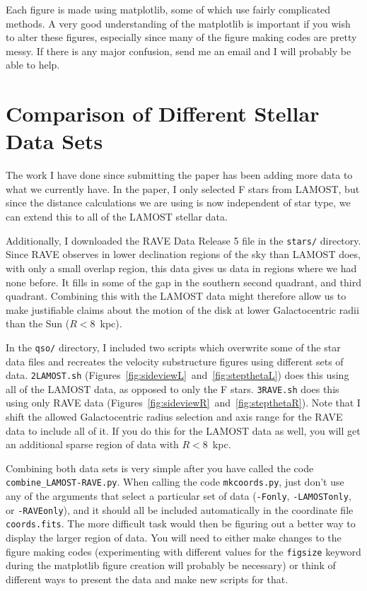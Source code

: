 \documentclass{article}
\begin{document}
Each figure is made using matplotlib, some of which use fairly complicated methods. A very good understanding of the matplotlib is important if you wish to alter these figures, especially since many of the figure making codes are pretty messy. If there is any major confusion, send me an email and I will probably be able to help.

\section{Comparison of Different Stellar Data Sets} \label{sec:futurework}

The work I have done since submitting the paper has been adding more data to what we currently have. In the paper, I only selected F stars from LAMOST, but since the distance calculations we are using is now independent of star type, we can extend this to all of the LAMOST stellar data.

Additionally, I downloaded the RAVE Data Release 5 file in the \texttt{stars/} directory. Since RAVE observes in lower declination regions of the sky than LAMOST does, with only a small overlap region, this data gives us data in regions where we had none before. It fills in some of the gap in the southern second quadrant, and third quadrant. Combining this with the LAMOST data might therefore allow us to make justifiable claims about the motion of the disk at lower Galactocentric radii than the Sun ($R<8$~kpc).

In the \texttt{qso/} directory, I included two scripts which overwrite some of the star data files and recreates the velocity substructure figures using different sets of data. \texttt{2LAMOST.sh} (Figures~\ref{fig:sideviewL}~and~\ref{fig:stepthetaL}) does this using all of the LAMOST data, as opposed to only the F stars. \texttt{3RAVE.sh} does this using only RAVE data (Figures~\ref{fig:sideviewR}~and~\ref{fig:stepthetaR}). Note that I shift the allowed Galactocentric radius selection and axis range for the RAVE data to include all of it. If you do this for the LAMOST data as well, you will get an additional sparse region of data with $R < 8$~kpc.

Combining both data sets is very simple after you have called the code \texttt{combine\_LAMOST-RAVE.py}. When calling the code \texttt{mkcoords.py}, just don't use any of the arguments that select a particular set of data (\texttt{-Fonly}, \texttt{-LAMOSTonly}, or \texttt{-RAVEonly}), and it should all be included automatically in the coordinate file \texttt{coords.fits}. The more difficult task would then be figuring out a better way to display the larger region of data. You will need to either make changes to the figure making codes (experimenting with different values for the \texttt{figsize} keyword during the matplotlib figure creation will probably be necessary) or think of different ways to present the data and make new scripts for that.
\end{document}
